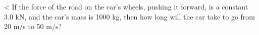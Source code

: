 <%
 If the force of the road on the car's wheels, pushing it
forward, is a constant 3.0 kN, and the car's mass is 1000
kg, then how long will the car take to go from 20 m/s to 50 m/s?
